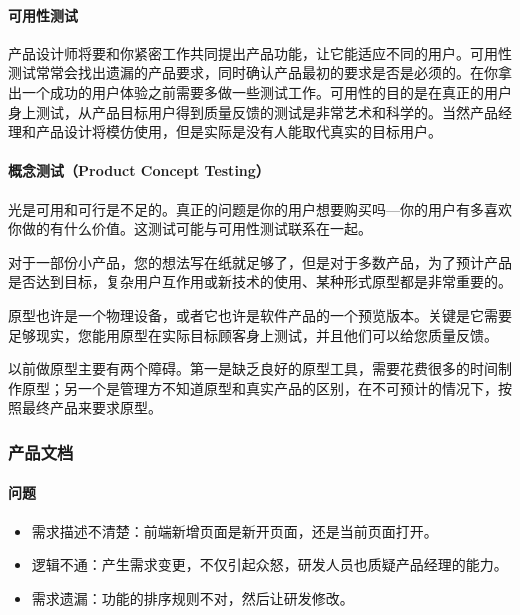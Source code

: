 \documentclass[letterpaper,11pt,english]{sphinxmanual}
\begin{document}
\paragraph{可用性测试}
\label{\detokenize{chapter_project/inspect:id3}}
产品设计师将要和你紧密工作共同提出产品功能，让它能适应不同的用户。可用性测试常常会找出遗漏的产品要求，同时确认产品最初的要求是否是必须的。在你拿出一个成功的用户体验之前需要多做一些测试工作。可用性的目的是在真正的用户身上测试，从产品目标用户得到质量反馈的测试是非常艺术和科学的。当然产品经理和产品设计将模仿使用，但是实际是没有人能取代真实的目标用户。


\paragraph{概念测试（Product Concept Testing）}
\label{\detokenize{chapter_project/inspect:product-concept-testing}}
光是可用和可行是不足的。真正的问题是你的用户想要购买吗—你的用户有多喜欢\sphinxhyphen{}你做的有什么价值。这测试可能与可用性测试联系在一起。

对于一部份小产品，您的想法写在纸就足够了，但是对于多数产品，为了预计产品是否达到目标，复杂用户互作用或新技术的使用、某种形式原型都是非常重要的。

原型也许是一个物理设备，或者它也许是软件产品的一个预览版本。关键是它需要足够现实，您能用原型在实际目标顾客身上测试，并且他们可以给您质量反馈。

以前做原型主要有两个障碍。第一是缺乏良好的原型工具，需要花费很多的时间制作原型；另一个是管理方不知道原型和真实产品的区别，在不可预计的情况下，按照最终产品来要求原型。


\subsubsection{产品文档}
\label{\detokenize{chapter_project/product_document:id1}}\label{\detokenize{chapter_project/product_document::doc}}

\paragraph{问题}
\label{\detokenize{chapter_project/product_document:id2}}\begin{itemize}
\item {} 
需求描述不清楚：前端新增页面是新开页面，还是当前页面打开。

\item {} 
逻辑不通：产生需求变更，不仅引起众怒，研发人员也质疑产品经理的能力。

\item {} 
需求遗漏：功能的排序规则不对，然后让研发修改。

\end{itemize}
\end{document}
